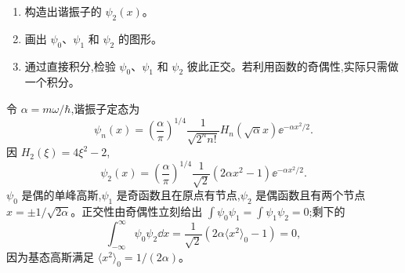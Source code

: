 \begin{question}
\begin{enumerate}
\item 构造出谐振子的 $\psi_2(x)$。
\item 画出 $\psi_0$、$\psi_1$ 和 $\psi_2$ 的图形。
\item 通过直接积分,检验 $\psi_0$、$\psi_1$ 和 $\psi_2$ 彼此正交。若利用函数的奇偶性,实际只需做一个积分。
\end{enumerate}
\begin{solution}
令 $\alpha=m\omega/\hbar$,谐振子定态为
\[
\psi_n(x)=\left(\frac{\alpha}{\pi}\right)^{1/4}\frac{1}{\sqrt{2^n n!}}H_n(\sqrt\alpha x)\ee^{-\alpha x^2/2}.
\]
因 $H_2(\xi)=4\xi^2-2$,
\[
\psi_2(x)=\left(\frac{\alpha}{\pi}\right)^{1/4}\frac1{\sqrt2}(2\alpha x^2-1)\ee^{-\alpha x^2/2}.
\]
$\psi_0$ 是偶的单峰高斯,$\psi_1$ 是奇函数且在原点有节点,$\psi_2$ 是偶函数且有两个节点 $x=\pm1/\sqrt{2\alpha}$。正交性由奇偶性立刻给出 $\int\psi_0\psi_1=\int\psi_1\psi_2=0$;剩下的
\[
\int_{-\infty}^{\infty}\psi_0\psi_2\dd x
=\frac1{\sqrt2}\left(2\alpha\langle x^2\rangle_0-1\right)=0,
\]
因为基态高斯满足 $\langle x^2\rangle_0=1/(2\alpha)$。
\end{solution}
\end{question}

